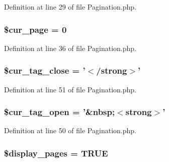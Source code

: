 Definition at line 29 of file Pagination.\-php.

\hypertarget{class_c_i___pagination_a0114271d3cbbe963a73efe317e3512c7}{
\subsubsection[{\$cur\-\_\-page}]{\setlength{\rightskip}{0pt plus 5cm}\$cur\-\_\-page = 0}}\label{class_c_i___pagination_a0114271d3cbbe963a73efe317e3512c7}


Definition at line 36 of file Pagination.\-php.

\hypertarget{class_c_i___pagination_a8f284fc318c9b1a0d20e5aa53cdbb540}{
\subsubsection[{\$cur\-\_\-tag\-\_\-close}]{\setlength{\rightskip}{0pt plus 5cm}\$cur\-\_\-tag\-\_\-close = '$<$/strong$>$'}}\label{class_c_i___pagination_a8f284fc318c9b1a0d20e5aa53cdbb540}


Definition at line 51 of file Pagination.\-php.

\hypertarget{class_c_i___pagination_a60f0f6e2515e166fa11657186b39345d}{
\subsubsection[{\$cur\-\_\-tag\-\_\-open}]{\setlength{\rightskip}{0pt plus 5cm}\$cur\-\_\-tag\-\_\-open = '\&nbsp;$<$strong$>$'}}\label{class_c_i___pagination_a60f0f6e2515e166fa11657186b39345d}


Definition at line 50 of file Pagination.\-php.

\hypertarget{class_c_i___pagination_ab68f1bc9a7442f1936286f05b7ba175d}{
\subsubsection[{\$display\-\_\-pages}]{\setlength{\rightskip}{0pt plus 5cm}\$display\-\_\-pages = T\-R\-U\-E}}\label{class_c_i___pagination_ab68f1bc9a7442f1936286f05b7ba175d}



